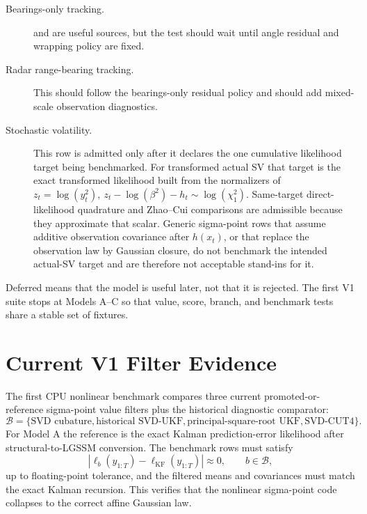 \begin{description}
  \item[Bearings-only tracking.]
    \citet{gordon1993novel} and \citet{arulampalam2002tutorial} are useful
    sources, but the test should wait until angle residual and wrapping policy
    are fixed.
  \item[Radar range-bearing tracking.]
    This should follow the bearings-only residual policy and should add
    mixed-scale observation diagnostics.
  \item[Stochastic volatility.]
    This row is admitted only after it declares the one cumulative likelihood
    target being benchmarked.  For transformed actual SV that target is the exact
    transformed likelihood built from the normalizers of
    \(
      z_t=\log(y_t^2),
      \ z_t-\log(\beta^2)-h_t\sim\log(\chi_1^2)
    \).
    Same-target direct-likelihood quadrature and Zhao--Cui comparisons are
    admissible because they approximate that scalar.  Generic sigma-point rows
    that assume additive observation covariance after \(h(x_t)\), or that replace
    the observation law by Gaussian closure, do not benchmark the intended
    actual-SV target and are therefore not acceptable stand-ins for it.
\end{description}

Deferred means that the model is useful later, not that it is rejected.  The
first V1 suite stops at Models A--C so that value, score, branch, and benchmark
tests share a stable set of fixtures.

\section{Current V1 Filter Evidence}
\label{sec:bf-nonlinear-current-v1-evidence}

The first CPU nonlinear benchmark compares three current promoted-or-reference
sigma-point value filters plus the historical diagnostic comparator:
\[
  \mathcal B=\{\text{SVD cubature},\text{historical SVD-UKF},\text{principal-square-root UKF},\text{SVD-CUT4}\}.
\]
For Model A the reference is the exact Kalman prediction-error likelihood after
structural-to-LGSSM conversion.  The benchmark rows must satisfy
\[
  \left|\ell_b(y_{1:T})-\ell_{\mathrm{KF}}(y_{1:T})\right|\approx 0,
  \qquad b\in\mathcal B,
\]
up to floating-point tolerance, and the filtered means and covariances must
match the exact Kalman recursion.  This verifies that the nonlinear
sigma-point code collapses to the correct affine Gaussian law.

